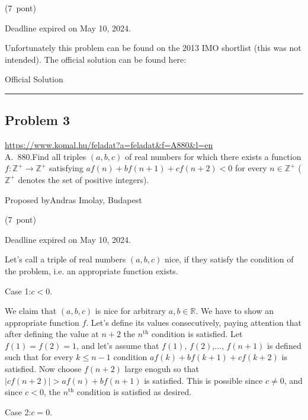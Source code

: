 \documentclass{article}
\begin{document}
(7 pont)

Deadline expired on May 10, 2024.

Unfortunately this problem can be found on the 2013 IMO shortlist (this was not intended). The official solution can be found here:

Official Solution

\vspace{1em}
\hrule
\vspace{1em}

\subsection*{Problem 3}
\noindent\url{https://www.komal.hu/feladat?a=feladat&f=A880&l=en}\\[1em]

A. 880.Find all triples \(\displaystyle (a,b,c)\) of real numbers for which there exists a function \(\displaystyle f\colon \mathbb{Z}^+ \to \mathbb{Z}^+\) satisfying \(\displaystyle af(n)+bf(n+1)+cf(n+2)<0\) for every \(\displaystyle n \in \mathbb{Z}^+\) (\(\displaystyle \mathbb{Z}^{+}\) denotes the set of positive integers).

Proposed byAndras Imolay, Budapest

(7 pont)

Deadline expired on May 10, 2024.

Let's call a triple of real numbers \(\displaystyle (a,b,c)\) nice, if they satisfy the condition of the problem, i.e. an appropriate function exists.

Case 1:\(\displaystyle c<0\).

We claim that \(\displaystyle (a,b,c)\) is nice for arbitrary \(\displaystyle a,b\in \mathbb{R}\). We have to show an appropriate function \(\displaystyle f\). Let's define its values consecutively, paying attention that after defining the value at \(\displaystyle n+2\) the \(\displaystyle n^{\text{th}}\) condition is satisfied. Let \(\displaystyle f(1)=f(2)=1\), and let's assume that \(\displaystyle f(1)\), \(\displaystyle f(2)\),..., \(\displaystyle f(n+1)\) is defined such that for every \(\displaystyle k\le n-1\) condition \(\displaystyle af(k)+bf(k+1)+cf(k+2)\) is satisfied. Now choose \(\displaystyle f(n+2)\) large enoguh so that \(\displaystyle |cf(n+2)|>af(n)+bf(n+1)\) is satisfied. This is possible since \(\displaystyle c\neq 0\), and since \(\displaystyle c<0\), the \(\displaystyle n^{\text{th}}\) condition is satisfied as desired.

Case 2:\(\displaystyle c=0\).
\end{document}
